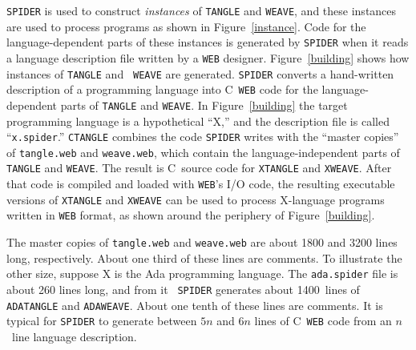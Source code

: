 {\tt SPIDER} is used to construct {\em instances} of {\tt TANGLE} and
{\tt WEAVE}, and these instances are used to process programs as
shown in Figure~\ref{instance}.
Code for the language-dependent parts of these instances is generated
by {\tt SPIDER} when it 
reads a language description file written by a {\tt WEB} designer.
Figure~\ref{building} shows how instances of {\tt TANGLE} and {\tt
WEAVE} are generated. 
{\tt SPIDER} converts a hand-written description of a programming language
into C~{\tt WEB} code for the language-dependent parts of {\tt TANGLE}
and {\tt WEAVE}. 
In Figure~\ref{building} the target programming language is a hypothetical
``X,'' and the description file is called ``{\tt x.spider}.''
{\tt CTANGLE} combines the code {\tt SPIDER} writes with the ``master
copies'' of {\tt tangle.web} and {\tt weave.web}, which contain the
language-independent parts of {\tt TANGLE} and {\tt WEAVE}.
The result is C~source code for {\tt XTANGLE} and {\tt XWEAVE}.
After that code is compiled and loaded with {\tt WEB}'s I/O code, the
resulting executable versions of {\tt XTANGLE} and {\tt XWEAVE} can be
used to process X-language programs written in {\tt WEB} format, as
shown around the periphery of Figure~\ref{building}.


The master copies of {\tt tangle.web} and {\tt weave.web} are about
1800 and 3200 lines long, respectively.
About one third of these lines are comments.
To illustrate the other size, suppose X is the Ada programming language.
The {\tt ada.spider} file is about 260 lines long, and from it {\tt
SPIDER} generates 
about 1400~lines of {\tt ADATANGLE} and {\tt ADAWEAVE}.
About one tenth of these lines are comments.
It is typical for {\tt SPIDER} to generate between $5n$ and $6n$ lines
of C~{\tt WEB} code from an $n$~line language description.

